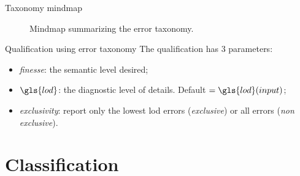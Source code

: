 \documentclass{beamer}
\begin{document}
            \begin{frame}{Taxonomy mindmap}
                \begin{figure}
                    
                    \caption{\label{fig::mindmap} Mindmap summarizing the error taxonomy.}
                \end{figure}
            \end{frame}
            \begin{frame}{Qualification using error taxonomy}
                The qualification has $3$ parameters:
                \begin{itemize}[label=$\blacktriangleright$, font=\color{IGNGreen}]
                    \item<1-> \emph{finesse}: the semantic level desired;
                    \item<2-> $\gls{lod}$: the diagnostic level of details. Default $ = \gls{lod}(input) $;
                    \item<3-> \emph{exclusivity}: report only the lowest \gls{lod} errors (\emph{exclusive}) or all errors (\emph{non exclusive}).
                \end{itemize}
            \end{frame}
    \section{Classification}
\end{document}
